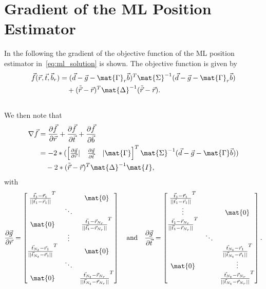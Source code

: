 \chapter{Gradient of the ML Position Estimator}\label{sec:appendix_gradient_position}
In the following the gradient of the objective function of the ML position estimator in~\eqref{eq:ml_solution} is shown.
The objective function is given by
\begin{align}
\vec{f}(\vec{r},\vec{t},\vec{b}_r)&=(\vec{d} - \vec{g} - \mat{\Gamma}_r\vec{b})^T \mat{\Sigma}^{-1}(\vec{d} - \vec{g} - \mat{\Gamma}_r\vec{b})\\\nonumber
&\quad+(\tilde{\vec{r}} - \vec{r})^T\mat{\Delta}^{-1}(\tilde{\vec{r}} - \vec{r}).\\\nonumber
\end{align}
We then note that
\begin{align}
\nabla\vec{f}&=
\frac{\partial\vec{f}}{\partial\vec{r}} + \frac{\partial\vec{f}}{\partial\vec{t}} + \frac{\partial\vec{f}}{\partial\vec{b}}\\\nonumber
&=-2*(
\begin{bmatrix}
\frac{\partial\vec{g}}{\partial\vec{r}} |& \frac{\partial\vec{g}}{\partial\vec{t}}  &| \mat{\Gamma}
\end{bmatrix}^T
\mat{\Sigma}^{-1}
(\vec{d} - \vec{g} - \mat{\Gamma}\vec{b}))\\\nonumber
&\quad-2*
(\tilde{\vec{r}} - \vec{r})^T\mat{\Delta}^{-1}\mat{I},
\end{align}
with
\begin{align}
\nonumber
\frac{\partial\vec{g}}{\partial\vec{r}} = 
\begin{bmatrix}
\frac{\vec{t}_1 - \vec{r}_1}{||\vec{t}_1 - \vec{r}_1||}^T & {} & \mat{0} \\
{}&\ddots&{}\\
\mat{0}&{}&\frac{\vec{t}_1 - \vec{r}_{N_r}}{||\vec{t}_1 - \vec{r}_{N_r}||}^T \\
{}&\vdots&{}\\
\frac{\vec{t}_{N_t} - \vec{r}_1}{||\vec{t}_{N_t} - \vec{r}_1||}^T & {} & \mat{0} \\
{}&\ddots&{}\\
\mat{0}&{}&\frac{\vec{t}_{N_t} - \vec{r}_{N_r}}{||\vec{t}_{N_t} - \vec{r}_{N_r}||}^T 
\end{bmatrix}\quad\text{and}\quad
\frac{\partial\vec{g}}{\partial\vec{t}} = 
\begin{bmatrix}
\frac{\vec{t}_1 - \vec{r}_1}{||\vec{t}_1 - \vec{r}_1||}^T & {} & {} \\
\vdots&{}&\mat{0}\\
\frac{\vec{t}_1 - \vec{r}_{N_r}}{||\vec{t}_1 - \vec{r}_{N_r}||}^T&{}&{} \\
{}&\ddots&{}\\
{} & {} & \frac{\vec{t}_{N_t} - \vec{r}_1}{||\vec{t}_{N_t} - \vec{r}_1||}^T \\
\mat{0}&{}&\vdots\\
{}&{}&\frac{\vec{t}_{N_t} - \vec{r}_{N_r}}{||\vec{t}_{N_t} - \vec{r}_{N_r}||}^T 
\end{bmatrix}.
\end{align}




